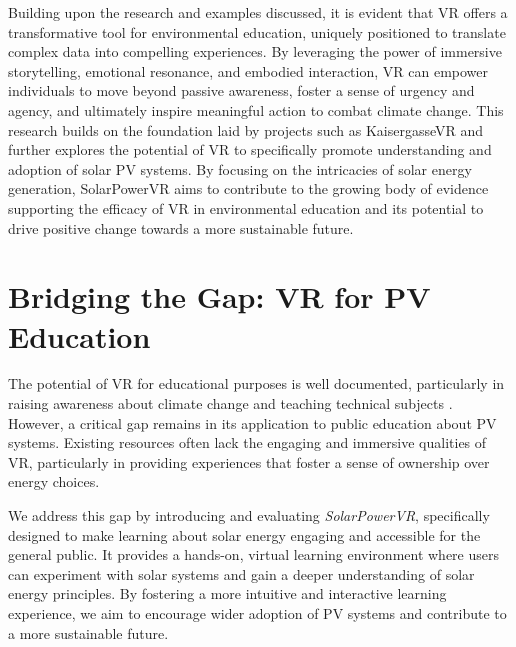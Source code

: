 \documentclass[draft, final]{vutinfth} %
\begin{document}
Building upon the research and examples discussed, it is evident that VR offers a transformative tool for environmental education, uniquely positioned to translate complex data into compelling experiences.  By leveraging the power of immersive storytelling, emotional resonance, and embodied interaction, VR can empower individuals to move beyond passive awareness, foster a sense of urgency and agency, and ultimately inspire meaningful action to combat climate change.  This research builds on the foundation laid by projects such as KaisergasseVR and further explores the potential of VR to specifically promote understanding and adoption of solar PV systems. By focusing on the intricacies of solar energy generation, SolarPowerVR aims to contribute to the growing body of evidence supporting the efficacy of VR in environmental education and its potential to drive positive change towards a more sustainable future.


\section{Bridging the Gap: VR for PV Education}

The potential of VR for educational purposes is well documented, particularly in raising awareness about climate change and teaching technical subjects \cite{HuAu2018VrExperience, Merchant2014VrEffectiveness, Queiroz2023Efficacy, McEvoy2023Climate}. However, a critical gap remains in its application to public education about PV systems. Existing resources often lack the engaging and immersive qualities of VR, particularly in providing experiences that foster a sense of ownership over energy choices.

We address this gap by introducing and evaluating \textit{SolarPowerVR}, specifically designed to make learning about solar energy engaging and accessible for the general public. It provides a hands-on, virtual learning environment where users can experiment with solar systems and gain a deeper understanding of solar energy principles. By fostering a more intuitive and interactive learning experience, we aim to encourage wider adoption of PV systems and contribute to a more sustainable future.
\end{document}
